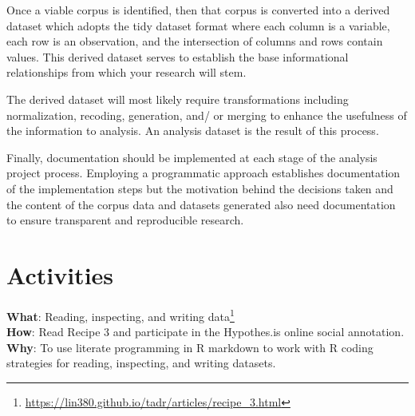 \documentclass[
  letterpaper,
]{scrbook}
\DeclareRobustCommand{\href}[2]{#2\footnote{\url{#1}}}
\begin{document}
Once a viable corpus is identified, then that corpus is converted into a
derived dataset which adopts the tidy dataset format where each column
is a variable, each row is an observation, and the intersection of
columns and rows contain values. This derived dataset serves to
establish the base informational relationships from which your research
will stem.

The derived dataset will most likely require transformations including
normalization, recoding, generation, and/ or merging to enhance the
usefulness of the information to analysis. An analysis dataset is the
result of this process.

Finally, documentation should be implemented at each stage of the
analysis project process. Employing a programmatic approach establishes
documentation of the implementation steps but the motivation behind the
decisions taken and the content of the corpus data and datasets
generated also need documentation to ensure transparent and reproducible
research.

\hypertarget{activities-1}{%
\section*{Activities}\label{activities-1}}


\begin{tcolorbox}[enhanced jigsaw, title=\textcolor{quarto-callout-tip-color}{\faLightbulb}\hspace{0.5em}{Recipe}, titlerule=0mm, toptitle=1mm, colbacktitle=quarto-callout-tip-color!10!white, bottomtitle=1mm, left=2mm, colframe=quarto-callout-tip-color-frame, breakable, toprule=.15mm, colback=white, opacitybacktitle=0.6, leftrule=.75mm, rightrule=.15mm, bottomrule=.15mm, arc=.35mm, coltitle=black, opacityback=0]

\textbf{What}:
\href{https://lin380.github.io/tadr/articles/recipe_3.html}{Reading,
inspecting, and writing data}\\
\textbf{How}: Read Recipe 3 and participate in the Hypothes.is online
social annotation.\\
\textbf{Why}: To use literate programming in R markdown to work with R
coding strategies for reading, inspecting, and writing datasets.

\end{tcolorbox}
\end{document}
